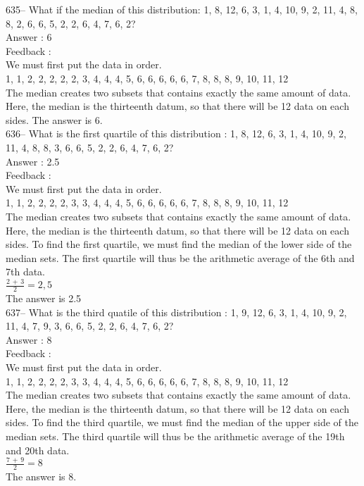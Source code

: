 \documentclass[letterpaper, 12pt]{article}
\begin{document}
635--  What if the median of this distribution: 1, 8, 12, 6, 3, 1, 4, 10,
9, 2, 11, 4, 8, 8, 2, 6, 6, 5, 2, 2, 6, 4, 7, 6, 2?\\

Answer : 6\\

Feedback : \\
We must first put the data in order.\\
1, 1, 2, 2, 2, 2, 2, 3, 4, 4, 4, 5, 6, 6, 6, 6, 6, 7, 8, 8, 8, 9, 10, 11, 12\\
The median creates two subsets that contains exactly the same amount of data. Here, the median is the thirteenth datum, so that there will be 12 data on each sides. The answer is 6.\\

636--  What is the first quartile of this distribution : 1, 8, 12, 6, 3, 1, 4,
10, 9, 2, 11, 4, 8, 8, 3, 6, 6, 5, 2, 2, 6, 4, 7, 6, 2?\\

Answer : 2.5\\

Feedback : \\
We must first put the data in order.\\
1, 1, 2, 2, 2, 2, 3, 3, 4, 4, 4, 5, 6, 6, 6, 6, 6, 7, 8, 8, 8, 9, 10, 11, 12\\
The median creates two subsets that contains exactly the same amount of data. Here, the median is the thirteenth datum, so that there will be 12 data on each sides.
To find the first quartile, we must find the median of the lower side of the median sets. The first quartile will thus be the arithmetic average of the 6th and 7th data.   \\[2mm]
$\frac{2\,+\,3}{2}=2,5$\\[2mm]
The answer is 2.5\\

637--  What is the third quatile of this distribution : 1, 9, 12, 6, 3, 1, 4, 10, 9, 2, 11, 4, 7, 9, 3, 6, 6, 5, 2, 2, 6, 4, 7, 6, 2?\\

Answer : 8\\

Feedback : \\
We must first put the data in order.\\
1, 1, 2, 2, 2, 2, 3, 3, 4, 4, 4, 5, 6, 6, 6, 6, 6, 7, 8, 8, 8, 9, 10, 11, 12\\
The median creates two subsets that contains exactly the same amount of data. Here, the median is the thirteenth datum, so that there will be 12 data on each sides.
To find the third quartile, we must find the median of the upper side of the median sets. The third quartile will thus be the arithmetic average of the 19th and 20th data.    \\[2mm]
$\frac{7\,+\,9}{2}=8$\\[2mm]
The answer is 8.\\
\end{document}
